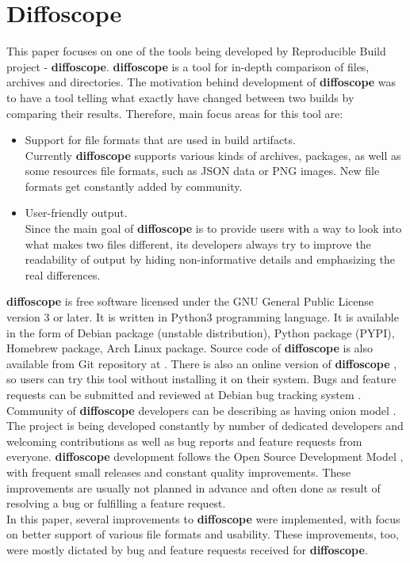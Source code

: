 \section{Diffoscope}

This paper focuses on one of the tools being developed by
Reproducible Build project - \textbf{diffoscope}.
\textbf{diffoscope} is a tool for in-depth comparison of files, archives and
directories\cite{dfs}.
The motivation behind development of \textbf{diffoscope} was to have a tool
telling what exactly have changed between two builds by comparing 
their results. Therefore, main focus areas for this tool are:
\begin{itemize}
    \item Support for file formats that are used in build artifacts. \\
    Currently \textbf{diffoscope} supports various kinds of archives, packages,
    as well as some resources file formats, such as JSON data or PNG images.
    New file formats get constantly added by community.
    \item User-friendly output.\\
    Since the main goal of \textbf{diffoscope} is to provide users with a way to look
    into what makes two files different, its developers always try to
    improve the readability of output by hiding non-informative details and
    emphasizing the real differences.
\end{itemize}

\textbf{diffoscope} is free software licensed under the GNU General Public 
License version 3 or later. It is written in Python3 programming language.
It is available in the form of Debian package (unstable distribution), 
Python package (PYPI), Homebrew package, Arch Linux package. Source code
of \textbf{diffoscope} is also available from Git repository at \cite{dfs-git}. 
There is also an online version of \textbf{diffoscope} \cite{try-dfs}, so users 
can try this tool without installing it on their system.
Bugs and feature requests can be submitted and reviewed at Debian
bug tracking system \cite{dfs-bugs}.\\
Community of \textbf{diffoscope} developers can be describing as having
onion model \cite{aberdour2007achieving}.
The project is being developed constantly by number of dedicated 
developers and welcoming contributions as well as bug reports 
and feature requests from everyone. 
\textbf{diffoscope} development follows the Open Source Development Model 
\cite{osdm}, with frequent small releases and constant quality improvements.
These improvements are usually not planned in advance and often
done as result of resolving a bug or fulfilling a feature request.\\
In this paper, several improvements to \textbf{diffoscope} were implemented,
with focus on better support of various file formats and usability.
These improvements, too, were mostly dictated by bug and feature requests
received for \textbf{diffoscope}.



